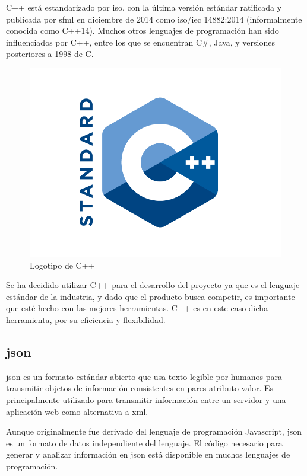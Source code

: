 		C++ está estandarizado por \acrshort{iso}, con la última versión estándar ratificada y publicada por \acrshort{sfml} en diciembre de 2014 como \acrshort{iso}/\acrshort{iec} 14882:2014 (informalmente conocida como C++14). Muchos otros lenguajes de programación han sido influenciados por C++, entre los que se encuentran C\#, Java, y versiones posteriores a 1998 de C.

		\begin{figure}[!htp]
			 \centering
			 \includegraphics{fig/cpp}
			 \caption{Logotipo de C++}
			 \label{fig:cpp}
		\end{figure}

		Se ha decidido utilizar C++ para el desarrollo del proyecto ya que es el lenguaje estándar de la industria, y dado que el producto busca competir, es importante que esté hecho con las mejores herramientas. C++ es en este caso dicha herramienta, por su eficiencia y flexibilidad.

	\subsection{\acrshort{json}}

		\acrfull{json} es un formato estándar abierto que usa texto legible por humanos para transmitir objetos de información consistentes en pares atributo-valor. Es principalmente utilizado para transmitir información entre un servidor y una aplicación web como alternativa a \acrshort{xml}.

		Aunque originalmente fue derivado del lenguaje de programación Javascript, \acrshort{json} es un formato de datos independiente del lenguaje. El código necesario para generar y analizar información en \acrshort{json} está disponible en muchos lenguajes de programación.

